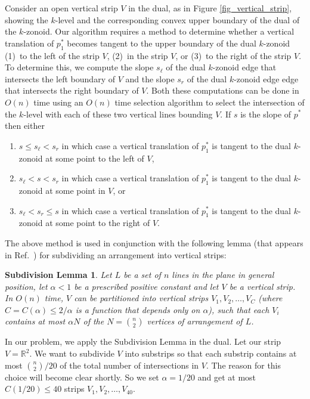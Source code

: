 \documentclass{elsart}
\newtheorem{thma}{Subdivision Lemma}
\begin{document}
Consider an open vertical strip $V$ in the dual, as in Figure
\ref{fig_vertical_strip}, showing the $k$-level and the corresponding
convex upper boundary of the dual of the $k$-zonoid.  Our algorithm
requires a method to determine whether a vertical translation of $p_1^*$
becomes tangent to the upper boundary of the dual $k$-zonoid  (1)~to
the left of the strip $V$, (2)~in
the strip $V$, or (3)~to the right of
the strip $V$.  To determine this, we compute the slope $s_\ell$ of
the dual $k$-zonoid edge that intersects the left boundary of $V$ and
the slope $s_r$ of the dual $k$-zonoid edge edge that intersects the
right boundary of $V$.  Both these computations can be done in $O(n)$
time using an $O(n)$ time selection algorithm to select the
intersection of the $k$-level with each of these two vertical lines
bounding $V$.  If $s$ is
the slope of $p^*$ then either
\begin{enumerate}
\item $s \le s_\ell < s_r$ in which case a vertical translation of
$p_1^*$ is tangent to the dual $k$-zonoid at some point to the left of
$V$, 
\item $s_\ell < s < s_r$ in which case a vertical translation of
$p_1^*$ is tangent to the dual $k$-zonoid at some point in 
$V$, or
\item $s_\ell < s_r \le s$ in which case a vertical translation of
$p_1^*$ is tangent to the dual $k$-zonoid at some point to the right
of $V$.
\end{enumerate}

The above method is used in conjunction with the following lemma
(that appears in Ref.~\cite{algorithms_for_ham_sandwich_cuts}) for
subdividing an arrangement into vertical strips:

\begin{thma}
Let $L$ be a set of $n$ lines in the plane in general position, let
$\alpha < 1$ be a prescribed positive constant and let $V$ be a
vertical strip. In $O(n)$ time, $V$ can be partitioned into vertical
strips $V_1, V_2, \ldots, V_C$ (where $C = C(\alpha)\le 2/\alpha$ is a function
that depends only on $\alpha$), such that each $V_i$ contains at most
$\alpha N$ of the $N = {n \choose 2}$ vertices of arrangement of
$L$. 
\end{thma}

In our problem, we apply the Subdivision Lemma in the dual. Let our
strip $V=\mathbb{R}^2$.  We want to subdivide $V$ into substrips so
that each substrip contains at most ${n\choose 2}/20$ of the
total number of intersections in $V$. The reason for this choice will
become clear shortly. So we set $\alpha = {1}/{20}$ and get at
most $C(1/20)\le 40$ strips $V_1, V_2, \ldots, V_{40}$.
\end{document}
